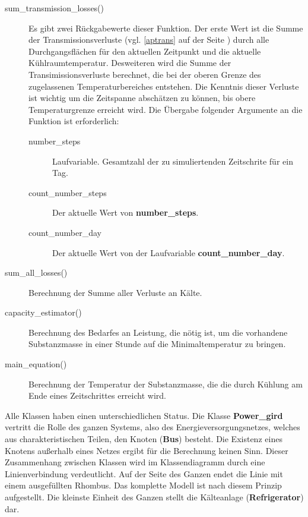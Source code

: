 \begin{description}
	\item[sum\_transmission\_losses()] Es gibt zwei R\"uckgabewerte dieser
	Funktion. Der erste Wert ist die Summe der Transmissionsverluste (vgl.
	\cref{aptrans} auf der Seite \pageref{ptrans}) durch alle
	Durchgangsfl\"achen f\"ur den aktuellen Zeitpunkt und die aktuelle
	K\"uhlraumtemperatur. Desweiteren wird die Summe der
	Transimissionsverluste berechnet, die bei der oberen Grenze des
	zugelassenen Temperaturbereiches entstehen. Die Kenntnis dieser Verluste
	ist wichtig um die Zeitspanne absch\"atzen zu k\"onnen, bis obere
	Temperaturgrenze erreicht wird. Die
	\"Ubergabe folgender Argumente an die Funktion ist erforderlich:
	\begin{description}
		\item[number\_steps] Laufvariable. Gesamtzahl der zu
		simuliertenden Zeitschrite f\"ur ein Tag.
		\item[count\_number\_steps] Der aktuelle Wert von
		\textbf{number\_steps}.
		\item[count\_number\_day] Der aktuelle Wert von der Laufvariable
		\textbf{count\_number\_day}.
	\end{description}

	\item[sum\_all\_losses()] Berechnung der Summe aller Verluste an K\"alte.
	\item[capacity\_estimator()] Berechnung des Bedarfes an Leistung, die
	n\"otig ist, um die vorhandene Substanzmasse in einer Stunde auf die
	Minimaltemperatur zu bringen.
	\item[main\_equation()] Berechnung der Temperatur der Substanzmasse, die
	die durch K\"uhlung am Ende eines Zeitschrittes erreicht wird.
\end{description}

Alle Klassen haben einen unterschiedlichen Status. Die Klasse
\textbf{Power\_gird} vertritt die Rolle des ganzen Systems, also des
Energieversorgungsnetzes, welches aus charakteristischen Teilen, den Knoten
(\textbf{Bus}) besteht. Die Existenz eines Knotens au\ss erhalb eines Netzes
ergibt f\"ur die Berechnung keinen Sinn. Dieser Zusammenhang zwischen Klassen
wird im Klassendiagramm durch eine Linienverbindung verdeutlicht. Auf der Seite
des Ganzen endet die Linie mit einem ausgef\"ullten Rhombus. Das komplette
Modell ist nach diesem Prinzip aufgestellt. Die kleinste Einheit des Ganzen
stellt die K\"alteanlage (\textbf{Refrigerator}) dar.

